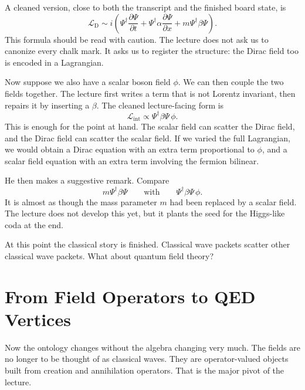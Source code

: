 A cleaned version, close to both the transcript and the finished board state, is
\begin{equation}
\mathcal L_{\mathrm D}
\sim
i\left(
\Psi^\dagger \frac{\partial\Psi}{\partial t}
+
\Psi^\dagger \alpha \frac{\partial\Psi}{\partial x}
+
m\Psi^\dagger\beta\Psi
\right).
\end{equation}
This formula should be read with caution. The lecture does not ask us to canonize every chalk mark. It asks us to register the structure: the Dirac field too is encoded in a Lagrangian.

Now suppose we also have a scalar boson field \(\phi\). We can then couple the two fields together. The lecture first writes a term that is not Lorentz invariant, then repairs it by inserting a \(\beta\). The cleaned lecture-facing form is
\begin{equation}
\mathcal L_{\mathrm{int}}\propto \Psi^\dagger\beta\Psi\,\phi.
\end{equation}
This is enough for the point at hand. The scalar field can scatter the Dirac field, and the Dirac field can scatter the scalar field. If we varied the full Lagrangian, we would obtain a Dirac equation with an extra term proportional to \(\phi\), and a scalar field equation with an extra term involving the fermion bilinear.

He then makes a suggestive remark. Compare
\begin{equation}
m\Psi^\dagger\beta\Psi
\qquad\text{with}\qquad
\Psi^\dagger\beta\Psi\,\phi.
\end{equation}
It is almost as though the mass parameter \(m\) had been replaced by a scalar field. The lecture does not develop this yet, but it plants the seed for the Higgs-like coda at the end.

At this point the classical story is finished. Classical wave packets scatter other classical wave packets. What about quantum field theory?

\section{From Field Operators to QED Vertices}

Now the ontology changes without the algebra changing very much. The fields are no longer to be thought of as classical waves. They are operator-valued objects built from creation and annihilation operators. That is the major pivot of the lecture.

